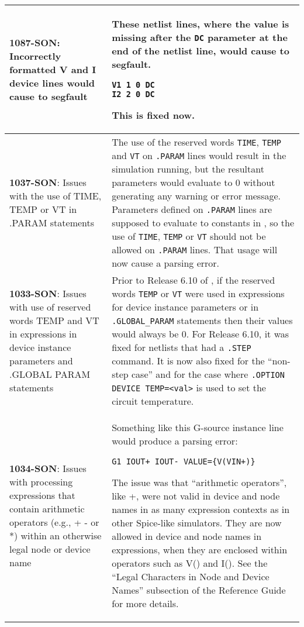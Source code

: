 {\begin{longtable}[h] {>{\raggedright\small}m{2in}|>{\raggedright\let\\\tabularnewline\small}m{3.5in}}
\textbf{1087-SON}: Incorrectly formatted V and I device lines would cause \Xyce{} to segfault  &
 These netlist lines, where the value is missing after the \texttt{DC}
 parameter at the end of the netlist line, would cause \Xyce{} to
 segfault.
\begin{verbatim}
V1 1 0 DC
I2 2 0 DC
\end{verbatim}
This is fixed now.  \\ \hline

\textbf{1037-SON}: Issues with the use of TIME, TEMP or VT in .PARAM statements &
The use of the reserved words \texttt{TIME}, \texttt{TEMP} and \texttt{VT} on
\texttt{.PARAM} lines would result in the simulation running, but the resultant
parameters would evaluate to 0 without generating any warning or error message.
Parameters defined on \texttt{.PARAM} lines are supposed to evaluate to
constants in \Xyce{}, so the use of \texttt{TIME}, \texttt{TEMP} or \texttt{VT}
should not be allowed on \texttt{.PARAM} lines.  That usage will now cause a
parsing error.
\\ \hline

\textbf{1033-SON}: Issues with use of reserved words TEMP and VT in expressions
in device instance parameters and .GLOBAL PARAM statements & Prior to Release 6.10
of \Xyce{}, if the reserved words \texttt{TEMP} or \texttt{VT} were used in
expressions for device instance parameters or in \texttt{.GLOBAL\_PARAM}
statements then their values would always be 0.  For Release 6.10, it was fixed
for netlists that had a \texttt{.STEP} command.  It is now also fixed for the
``non-step case'' and for the case where \texttt{.OPTION DEVICE TEMP=<val>}
is used to set the circuit temperature.
\\ \hline

\textbf{1034-SON}: Issues with processing expressions that contain arithmetic
operators (e.g., + - or *) within an otherwise legal node or device name &
Something like this G-source instance line would produce a parsing error:
\begin{verbatim}
G1 IOUT+ IOUT- VALUE={V(VIN+)}
\end{verbatim}
The issue was that ``arithmetic operators'', like +, were not valid in device and
node names in as many expression contexts as in other Spice-like simulators.  They are now
allowed in device and node names in expressions, when they are enclosed within \Xyce{} 
operators such as V() and I().  See the ``Legal Characters in Node
and Device Names'' subsection of the \Xyce{} Reference Guide for more details.
\\ \hline


\end{longtable}}
